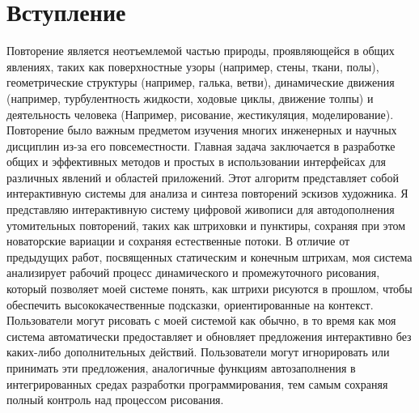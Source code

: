 \chapter{Вступление}
\label{cha:intro}
Повторение является неотъемлемой частью природы, проявляющейся в общих явлениях, таких как поверхностные узоры (например, стены, ткани, полы), геометрические структуры (например, галька, ветви), динамические движения (например, турбулентность жидкости, ходовые циклы, движение толпы) и деятельность человека (Например, рисование, жестикуляция, моделирование). Повторение было важным предметом изучения многих инженерных и научных дисциплин из-за его повсеместности. Главная задача заключается в разработке общих и эффективных методов и простых в использовании интерфейсах для различных явлений и областей приложений. Этот алгоритм представляет собой интерактивную системы для анализа и синтеза повторений эскизов художника.
Я представляю интерактивную систему цифровой живописи для автодополнения утомительных повторений, таких как штриховки и пунктиры, сохраняя при этом новаторские вариации и сохраняя естественные потоки. В отличие от предыдущих работ, посвященных статическим и конечным штрихам, моя система анализирует рабочий процесс динамического и промежуточного рисования, который позволяет моей системе понять, как штрихи рисуются в прошлом, чтобы обеспечить высококачественные подсказки, ориентированные на контекст. Пользователи могут рисовать с моей системой как обычно, в то время как моя система автоматически предоставляет и обновляет предложения интерактивно без каких-либо дополнительных действий. Пользователи могут игнорировать или принимать эти предложения, аналогичные функциям автозаполнения в интегрированных средах разработки программирования, тем самым сохраняя полный контроль над процессом рисования.